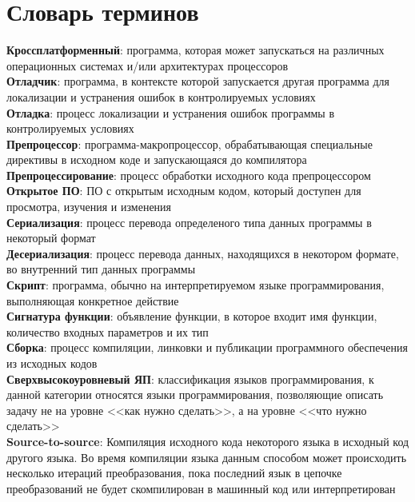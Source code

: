 \chapter*{Словарь терминов}             %

\textbf{Кроссплатформенный}: программа, которая может запускаться на различных операционных системах и/или архитектурах процессоров           \\
\textbf{Отладчик}: программа, в контексте которой запускается другая программа для локализации и устранения ошибок
в контролируемых условиях                                                                                                                     \\
\textbf{Отладка}: процесс локализации и устранения ошибок программы в контролируемых условиях                                                 \\
\textbf{Препроцессор}: программа-макропроцессор, обрабатывающая специальные директивы в исходном коде и запускающаяся до компилятора          \\
\textbf{Препроцессирование}: процесс обработки исходного кода препроцессором                                                                  \\
\textbf{Открытое ПО}: ПО с открытым исходным кодом, который доступен для просмотра, изучения и изменения                                      \\
\textbf{Сериализация}: процесс перевода определеного типа данных программы в некоторый формат                                                 \\
\textbf{Десериализация}: процесс перевода данных, находящихся в некотором формате, во внутренний тип данных программы                         \\
\textbf{Скрипт}: программа, обычно на интерпретируемом языке программирования, выполняющая конкретное действие                                \\
\textbf{Сигнатура функции}: объявление функции, в которое входит имя функции, количество входных параметров и их тип                          \\
\textbf{Сборка}: процесс компиляции, линковки и публикации программного обеспечения из исходных кодов                                         \\
\textbf{Сверхвысокоуровневый ЯП}: классификация языков программирования, к данной категории относятся языки программирования,
позволяющие описать задачу не на уровне <<как нужно сделать>>, а на уровне <<что нужно сделать>>                                              \\
\textbf{Source-to-source}: Компиляция исходного кода некоторого языка в исходный код другого языка. Во время компиляции языка данным способом
 может происходить несколько итераций преобразования,
 пока последний язык в цепочке преобразований не будет скомпилирован в машинный код или интерпретирован \\

